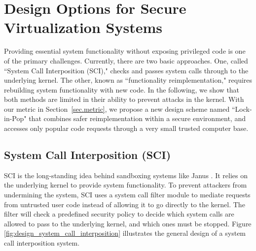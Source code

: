 \section{Design Options for Secure Virtualization Systems}
\label{sec.design}


Providing essential system functionality without exposing privileged code is one of the
primary challenges. %
Currently, there are two basic approaches.
One, called ``System Call Interposition (SCI)," checks and passes system calls
through to the underlying kernel. The other, known as ``functionality
reimplementation," requires rebuilding system functionality with new code. In the
following, we show that both methods are limited in their ability to
prevent attacks in the kernel. %
With our metric in Section~\ref{sec.metric}, 
we propose a new design scheme named ``Lock-in-Pop" that combines safer reimplementation
within a secure environment, and accesses only popular code requests through a
very small trusted computer base.



\subsection{System Call Interposition (SCI)}
SCI is the long-standing idea behind sandboxing systems like Janus
\cite{Janus0:96, Janus:99}. It relies on the underlying kernel
to provide system functionality. To prevent attackers from undermining the system,
SCI uses a system call filter module to mediate requests
from untrusted user code instead of allowing it to go directly to the kernel.
The filter will check a predefined security policy to decide which system calls are
allowed to pass to the underlying kernel, and which ones must be stopped.
%
Figure \ref{fig:design_system_call_interposition} illustrates the general design
of a system call interposition system.

